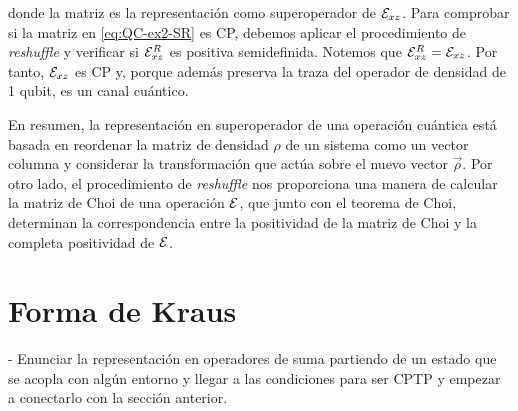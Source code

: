 donde la matriz es la representación como superoperador de $\mathcal{E}_{xz}$. 
Para comprobar si la matriz en \eqref{eq:QC-ex2-SR} es CP, debemos 
aplicar el procedimiento de \textit{reshuffle} y verificar si $\mathcal{E}_{xz}^R$
es positiva semidefinida. Notemos que $\mathcal{E}_{xz}^R=\mathcal{E}_{xz}$. Por tanto, 
$\mathcal{E}_{xz}$ es CP y, porque además preserva la traza del operador
de densidad de 1 qubit, es un canal cuántico.

En resumen, la representación en superoperador de una operación cuántica
está basada en reordenar la matriz de densidad $\rho$ de un sistema como 
un vector columna y considerar la transformación que actúa sobre el nuevo
vector $\vec{\rho}$. Por otro lado, el procedimiento de \textit{reshuffle} 
nos proporciona una manera de calcular la matriz de Choi de una operación $\mathcal{E}$,
que junto con el teorema de Choi, determinan la correspondencia entre
la positividad de la matriz de Choi y la completa positividad de $\mathcal{E}$. 

\section{Forma de Kraus}
- Enunciar la representación en operadores de suma partiendo de un 
estado que se acopla con algún entorno
y llegar a las condiciones para ser CPTP y empezar a conectarlo
con la sección anterior. 


